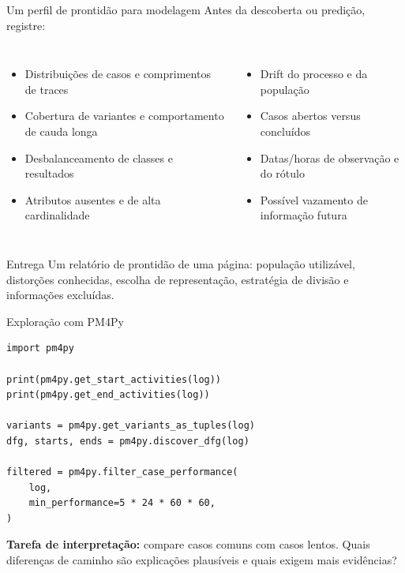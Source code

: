 \documentclass[aspectratio=169,11pt]{beamer}
\begin{document}
\begin{frame}[shrink=4]{Um perfil de prontidão para modelagem}
  Antes da descoberta ou predição, registre:
  \begin{columns}[T,onlytextwidth]
      \begin{itemize}
        \item Distribuições de casos e comprimentos de traces
        \item Cobertura de variantes e comportamento de cauda longa
        \item Desbalanceamento de classes e resultados
        \item Atributos ausentes e de alta cardinalidade
      \end{itemize}
      \begin{itemize}
        \item Drift do processo e da população
        \item Casos abertos versus concluídos
        \item Datas/horas de observação e do rótulo
        \item Possível vazamento de informação futura
      \end{itemize}
  \end{columns}
  \vspace{0.4cm}
  \begin{block}{Entrega}
    Um relatório de prontidão de uma página: população utilizável, distorções conhecidas, escolha de representação, estratégia de divisão e informações excluídas.
  \end{block}
\end{frame}

\begin{frame}[fragile]{Exploração com PM4Py}
\begin{lstlisting}[style=python]
import pm4py

print(pm4py.get_start_activities(log))
print(pm4py.get_end_activities(log))

variants = pm4py.get_variants_as_tuples(log)
dfg, starts, ends = pm4py.discover_dfg(log)

filtered = pm4py.filter_case_performance(
    log,
    min_performance=5 * 24 * 60 * 60,
)
\end{lstlisting}
  \vspace{0.15cm}
  \textbf{Tarefa de interpretação:} compare casos comuns com casos lentos. Quais diferenças de caminho são explicações plausíveis e quais exigem mais evidências?
\end{frame}
\end{document}

